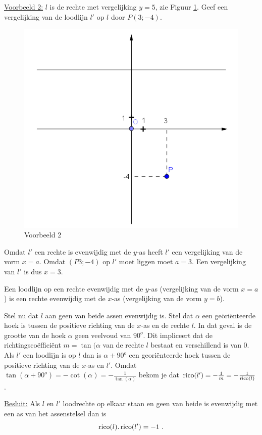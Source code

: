 \noindent \underline{Voorbeeld 2:} $l$ is de rechte met vergelijking $y=5$, zie Figuur \ref{fig4.2.10_fig2}.
Geef een vergelijking van de loodlijn $l'$ op $l$ door $P(3;-4)$.
\begin{figure}[!htb]
\begin{center}
\includegraphics[height=7 cm]{4_opp_inhoud_an_meetk/inputs/AMTekst5Fig2}
\caption{Voorbeeld 2}
\label{fig4.2.10_fig2}
\end{center}
\end{figure} 
Omdat $l'$ een rechte is evenwijdig met de $y$-as heeft $l'$ een vergelijking van de vorm $x=a$.
Omdat $(P3;-4)$ op $l'$ moet liggen moet $a=3$.
Een vergelijking van $l'$ is dus $x=3$.

Een loodlijn op een rechte evenwijdig met de $y$-as (vergelijking van de vorm $x=a$) is een rechte evenwijdig met de $x$-as (vergelijking van de vorm $y=b$).

Stel nu dat $l$ aan geen van beide assen evenwijdig is.
Stel dat $\alpha$ een ge\"ori\"enteerde hoek is tussen de positieve richting van de $x$-as en de rechte $l$.
In dat geval is de grootte van de hoek $\alpha$ geen veelvoud van $90^o$.
Dit impliceert dat de richtingsco\"effici\"ent $m=\tan (\alpha$ van de rechte $l$ bestaat en verschillend is van 0.
Als $l'$ een loodlijn is op $l$ dan is $\alpha + 90^o$ een geori\"enteerde hoek tussen de positieve richting van de $x$-as en $l'$.
Omdat $\tan (\alpha + 90^o)=-\cot (\alpha)=-\frac{1}{\tan (\alpha)}$  bekom je dat $\operatorname{rico} (l')=-\frac{1}{m}=-\frac{1}{\operatorname{rico} (l)}$.

\underline {Besluit:} Als $l$ en $l'$ loodrechte op elkaar staan en geen van beide is evenwijdig met een as van het assenstelsel dan is
\[
\operatorname{rico} (l).\operatorname{rico} (l')=-1 \text { .}
\]



